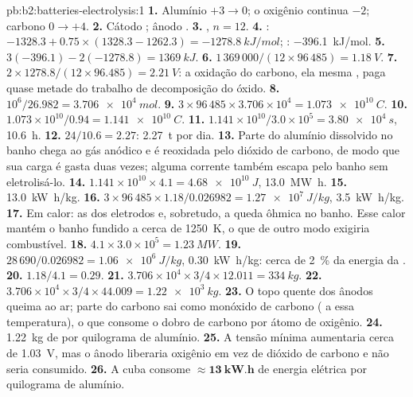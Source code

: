 \begin{solution}{pb:b2:batteries-electrolysis:1}
\textbf{1.} Alumínio $+3 \to 0$; o oxigênio continua $-2$; carbono $0 \to +4$.
\textbf{2.} Cátodo ; ânodo .
\textbf{3.} , $n = 12$.
\textbf{4.} : $-1328.3 + 0.75 \times (1328.3 - 1262.3) = \qty{-1278.8}{kJ/mol}$;
: \qty{-396.1}{kJ/mol}.
\textbf{5.} $3(-396.1) - 2(-1278.8) = \qty{+1369}{kJ}$.
\textbf{6.} $1\,369\,000/(12 \times 96\,485) = \qty{1.18}{V}$.
\textbf{7.} $2 \times 1278.8/(12 \times 96.485) = \qty{2.21}{V}$: a oxidação do carbono,
ela mesma , paga quase metade do trabalho de decomposição do óxido.
\textbf{8.} $10^6/26.982 = \qty{3.706e4}{mol}$.
\textbf{9.} $3 \times 96\,485 \times 3.706 \times 10^4 = \qty{1.073e10}{C}$.
\textbf{10.} $1.073 \times 10^{10}/0.94 = \qty{1.141e10}{C}$.
\textbf{11.} $1.141 \times 10^{10}/3.0 \times 10^5 = \qty{3.80e4}{s}$, \qty{10.6}{h}.
\textbf{12.} $24/10.6 = 2.27$: \qty{2.27}{t} por dia.
\textbf{13.} Parte do alumínio dissolvido no banho chega ao gás anódico e é
reoxidada pelo dióxido de carbono, de modo que sua carga é gasta duas vezes;
alguma corrente também escapa pelo banho sem eletrolisá-lo.
\textbf{14.} $1.141 \times 10^{10} \times 4.1 = \qty{4.68e10}{J}$, \qty{13.0}{MW.h}.
\textbf{15.} \qty{13.0}{kW.h/kg}.
\textbf{16.} $3 \times 96\,485 \times 1.18/0.026982 = \qty{1.27e7}{J/kg}$, \qty{3.5}{kW.h/kg}.
\textbf{17.} Em calor: as  dos eletrodos e, sobretudo, a queda
ôhmica no banho. Esse calor mantém o banho fundido a cerca de
\qty{1250}{K}, o que de outro modo exigiria combustível.
\textbf{18.} $4.1 \times 3.0 \times 10^5 = \qty{1.23}{MW}$.
\textbf{19.} $28\,690/0.026982 = \qty{1.06e6}{J/kg}$, \qty{0.30}{kW.h/kg}: cerca de 2~\% da
energia da .
\textbf{20.} $1.18/4.1 = 0.29$.
\textbf{21.} $3.706 \times 10^4 \times 3/4 \times 12.011 = \qty{334}{kg}$.
\textbf{22.} $3.706 \times 10^4 \times 3/4 \times 44.009 = \qty{1.22e3}{kg}$.
\textbf{23.} O topo quente dos ânodos queima ao ar; parte do carbono sai
como monóxido de carbono ( a essa temperatura), o que
consome o dobro de carbono por átomo de oxigênio.
\textbf{24.} \qty{1.22}{kg} de  por quilograma de alumínio.
\textbf{25.} A tensão mínima aumentaria cerca de \qty{1.03}{V}, mas o ânodo
liberaria oxigênio em vez de dióxido de carbono e não seria consumido.
\textbf{26.} A cuba consome $\boldsymbol{\approx \qty{13}{kW.h}}$ de energia
elétrica por quilograma de alumínio.
\end{solution}
